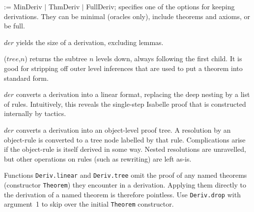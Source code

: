 \begin{ttdescription}
\item[\ttindexbold{keep_derivs} := MinDeriv $|$ ThmDeriv $|$ FullDeriv;] 
specifies one of the options for keeping derivations.  They can be
minimal (oracles only), include theorems and axioms, or be full.

\item[\ttindexbold{Deriv.size} $der$] yields the size of a derivation,
  excluding lemmas.

\item[\ttindexbold{Deriv.drop} ($tree$,$n$)] returns the subtree $n$ levels
  down, always following the first child.  It is good for stripping off
  outer level inferences that are used to put a theorem into standard form.

\item[\ttindexbold{Deriv.linear} $der$] converts a derivation into a linear
  format, replacing the deep nesting by a list of rules.  Intuitively, this
  reveals the single-step Isabelle proof that is constructed internally by
  tactics.  

\item[\ttindexbold{Deriv.tree} $der$] converts a derivation into an
  object-level proof tree.  A resolution by an object-rule is converted to a
  tree node labelled by that rule.  Complications arise if the object-rule is
  itself derived in some way.  Nested resolutions are unravelled, but other
  operations on rules (such as rewriting) are left as-is.  
\end{ttdescription}

Functions {\tt Deriv.linear} and {\tt Deriv.tree} omit the proof of any named
theorems (constructor {\tt Theorem}) they encounter in a derivation.  Applying
them directly to the derivation of a named theorem is therefore pointless.
Use {\tt Deriv.drop} with argument~1 to skip over the initial {\tt Theorem}
constructor.





